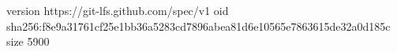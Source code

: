 version https://git-lfs.github.com/spec/v1
oid sha256:f8e9a31761cf25e1bb36a5283cd7896abea81d6e10565e7863615de32a0d185c
size 5900
